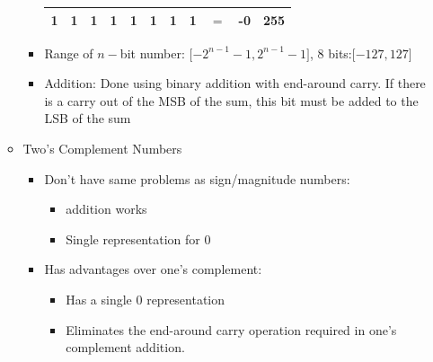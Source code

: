 \documentclass[a4paper]{article}
\begin{document}
\begin{itemize}
\begin{itemize}
\begin{itemize}
\begin{tabular}{|c|c|c|c|c|c|c|c|c|c|c|}
1&1&1&1&1&1&1&1&$=$&-0&255\\\hline
\end{tabular}
\item Range of $n-$bit number: $\lbrack -2^{n-1}-1,2^{n-1}-1\rbrack$, 8 bits:$\lbrack -127,127\rbrack$
\item Addition: Done using binary addition with end-around carry. If there is a carry out of the MSB of the sum, this bit must be added to the LSB of the sum
\end{itemize}
\item Two's Complement Numbers
\begin{itemize}
\item Don't have same problems as sign/magnitude numbers:
\begin{itemize}
\item addition works
\item Single representation for 0
\end{itemize}
\item Has advantages over one's complement:
\begin{itemize}
\item Has a single 0 representation
\item Eliminates the end-around carry operation required in one's complement addition.
\end{itemize}


\end{itemize}
\end{itemize}
\end{itemize}
\end{document}
